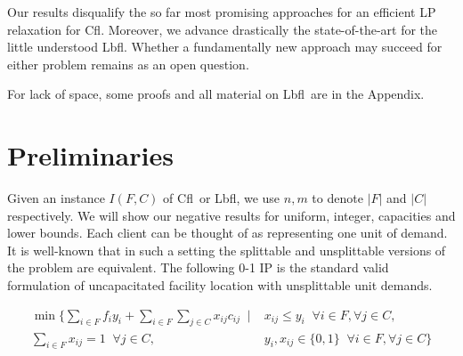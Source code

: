 \documentclass[11pt]{article}
\newcommand{\lbfl}{{\sc Lbfl}}
\newcommand{\cfl}{{\sc Cfl}}
\begin{document}
Our  results disqualify  the  so far most promising approaches 
 for an efficient LP relaxation
for  \cfl. Moreover, we advance drastically the state-of-the-art for the
little understood \lbfl. 
Whether a fundamentally new approach
may succeed for either problem remains as an open question. 

\iffalse 
Our three  results  and their proofs seem additionally to suggest 
 that a bounded-gap relaxation should  not  constrain  the number of variables
 appearing in each  inequality. 
Whether such  non-trivial inequalities,   with large support and an
efficient separation oracle, exist is an open question. 
\fi 

For lack of space, some proofs and all material on \lbfl\ are
 in the Appendix. 







\section{Preliminaries}
\label{sec:prel}


Given an instance $I(F,C)$ of \cfl\ or \lbfl, we use $n, m$ to denote $|F|$ and $|C|$
respectively.
We will show our negative results for uniform, integer, capacities and lower
bounds. Each client can be thought of as representing one unit of demand.
 It  is  well-known  that in such a setting  the  splittable  and
unsplittable versions  of the problem are equivalent. 
The following 0-1  IP is the standard  valid formulation of uncapacitated 
facility location with unsplittable unit demands.

\vspace*{-0.35cm}
\[ 
\begin{array}{ccc}
 \min \{ \sum_{i \in F} f_iy_i + \sum_{i \in F}\sum_{j
  \in C} x_{ij}c_{ij}  \; \mid   &    x_{ij} \leq y_i   \;\;  \forall i \in F, \forall j \in C,  \\    
\sum_{i \in F} x_{ij} =1   \;\;  \forall j \in C,   & 
y_i, x_{ij} \in \{0,1\}   \;\; \forall i \in F, \forall j \in C   \}
\end{array} \]
\vspace*{-0.2cm}

\iffalse 
\[ \min \{ \sum\limits_{i \in F} f_iy_i + \sum\limits_{i \in F}\sum_{j
  \in C} x_{ij}c_{ij}  \mid    
x_{ij} \leq y_i   \;\;  \forall i \in F, \forall j \in C    
\sum\limits_{i \in F} x_{ij} =1   \;\;  \forall j \in C   
y_i, x_{ij} \in \{0,1\}   \;\; \forall i \in F, \forall j \in C  \} \]
\fi 
\end{document}
